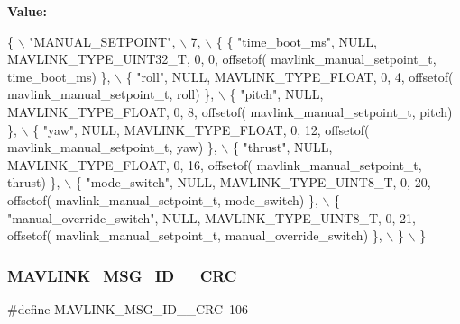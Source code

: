 {\bfseries Value\+:}
\begin{DoxyCode}
\{ \(\backslash\)
    \textcolor{stringliteral}{"MANUAL\_SETPOINT"}, \(\backslash\)
    7, \(\backslash\)
    \{  \{ \textcolor{stringliteral}{"time\_boot\_ms"}, NULL, MAVLINK_TYPE_UINT32_T, 0, 0, offsetof(
      mavlink_manual_setpoint_t, time\_boot\_ms) \}, \(\backslash\)
         \{ \textcolor{stringliteral}{"roll"}, NULL, MAVLINK_TYPE_FLOAT, 0, 4, offsetof(
      mavlink_manual_setpoint_t, roll) \}, \(\backslash\)
         \{ \textcolor{stringliteral}{"pitch"}, NULL, MAVLINK_TYPE_FLOAT, 0, 8, offsetof(
      mavlink_manual_setpoint_t, pitch) \}, \(\backslash\)
         \{ \textcolor{stringliteral}{"yaw"}, NULL, MAVLINK_TYPE_FLOAT, 0, 12, offsetof(
      mavlink_manual_setpoint_t, yaw) \}, \(\backslash\)
         \{ \textcolor{stringliteral}{"thrust"}, NULL, MAVLINK_TYPE_FLOAT, 0, 16, offsetof(
      mavlink_manual_setpoint_t, thrust) \}, \(\backslash\)
         \{ \textcolor{stringliteral}{"mode\_switch"}, NULL, MAVLINK_TYPE_UINT8_T, 0, 20, offsetof(
      mavlink_manual_setpoint_t, mode\_switch) \}, \(\backslash\)
         \{ \textcolor{stringliteral}{"manual\_override\_switch"}, NULL, MAVLINK_TYPE_UINT8_T, 0, 21, offsetof(
      mavlink_manual_setpoint_t, manual\_override\_switch) \}, \(\backslash\)
         \} \(\backslash\)
\}
\end{DoxyCode}
\mbox{\label{mavlink__msg__manual__setpoint_8h_aecae4564b60065228d0ca743af500a81}} 
\subsubsection{M\+A\+V\+L\+I\+N\+K\+\_\+\+M\+S\+G\+\_\+\+I\+D\+\_\+\_\+\+C\+RC}
{\footnotesize\ttfamily \#define M\+A\+V\+L\+I\+N\+K\+\_\+\+M\+S\+G\+\_\+\+I\+D\+\_\+\_\+\+C\+RC~106}

\mbox{\label{mavlink__msg__manual__setpoint_8h_a6373b19048048c228a25d9ae4289046b}} 
